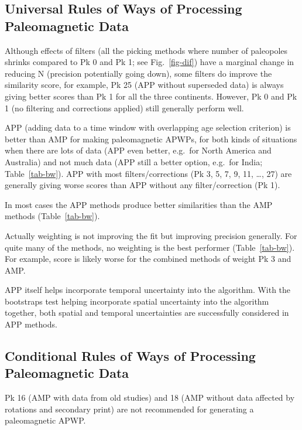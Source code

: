 \subsection{Universal Rules of Ways of Processing Paleomagnetic Data}
%
\begin{description}
  \item Although effects of filters (all the picking methods where number of
	paleopoles shrinks compared to Pk 0 and Pk 1; see Fig.~\ref{fig-dif}) have a
	marginal change in reducing N (precision potentially going down), some
	filters do improve the similarity score, for example, Pk 25 (APP without
	superseded data) is always giving better scores than Pk 1 for all the
	three continents. However, Pk 0 and Pk 1 (no filtering and corrections
	applied) still generally perform well.
  \item APP (adding data to a time window with overlapping age selection
	criterion) is better than AMP for making paleomagnetic APWPs, for both kinds
	of situations when there are lots of data (APP even better, e.g.\ for North
	America and Australia) and not much data (APP still a better option, e.g.\
	for India; Table~\ref{tab-bw}). APP with most filters/corrections (Pk 3, 5,
	7, 9, 11, \ldots, 27) are generally giving worse scores than APP without any
	filter/correction (Pk 1).
  \item In most cases the APP methods produce better similarities than the AMP
	methods (Table~\ref{tab-bw}).
  \item Actually weighting is not improving the fit but improving precision
	generally. For quite many of the methods, no weighting is the best performer
	(Table~\ref{tab-bw}). For example, score is likely worse for the combined
	methods of weight Pk 3 and AMP\@.
  \item APP itself helps incorporate temporal uncertainty into the algorithm.
	With the bootstraps test helping incorporate spatial uncertainty into the
	algorithm together, both spatial and temporal uncertainties are successfully
	considered in APP methods.
\end{description}

\subsection{Conditional Rules of Ways of Processing Paleomagnetic Data}
%
\begin{description}
  \item Pk 16 (AMP with data from old studies) and 18 (AMP
	without data affected by rotations and secondary print) are not recommended
	for generating a paleomagnetic APWP\@.
\end{description}

